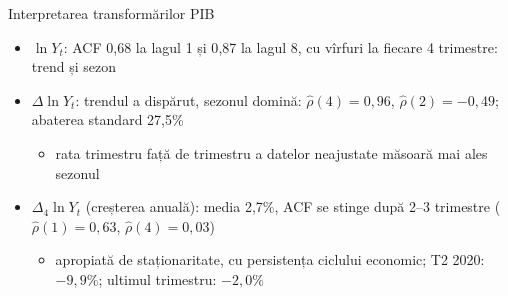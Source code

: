 \begin{frame}{Interpretarea transformărilor PIB}
\itemsize{\small}
\begin{itemize}
    \item $\ln Y_t$: ACF 0{,}68 la lagul 1 și 0{,}87 la lagul 8, cu vîrfuri la fiecare 4 trimestre: trend și sezon
    \item $\Delta\ln Y_t$: trendul a dispărut, sezonul domină: $\hat\rho(4) = 0{,}96$, $\hat\rho(2) = \ensuremath{-}0{,}49$; abaterea standard 27{,}5\%
    \begin{itemize}
        \item rata trimestru față de trimestru a datelor neajustate măsoară mai ales sezonul
    \end{itemize}
    \item $\Delta_4\ln Y_t$ (creșterea anuală): media 2{,}7\%, ACF se stinge după 2--3 trimestre ($\hat\rho(1) = 0{,}63$, $\hat\rho(4) = 0{,}03$)
    \begin{itemize}
        \item apropiată de staționaritate, cu persistența ciclului economic; T2 2020: $\ensuremath{-}9{,}9\%$; ultimul trimestru: $\ensuremath{-}2{,}0\%$
    \end{itemize}
\end{itemize}
\end{frame}

